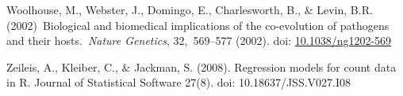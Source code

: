 \documentclass[12pt]{article}
\renewcommand{\_}{\kern-1.5pt\textunderscore\kern-1.5pt}
\begin{document}
\begin{FlushLeft}
Woolhouse, M., Webster, J., Domingo, E., Charlesworth, B., $\&$  Levin, B.R. (2002) Biological and biomedical implications of the co-evolution of pathogens and their hosts. \textit{Nature Genetics}, 32, 569–577 (2002). doi: \href{https://doi.org/10.1038/ng1202-569}{10.1038/ng1202-569}
\end{FlushLeft}\par

\begin{FlushLeft}
Zeileis, A., Kleiber, C., $\&$  Jackman, S. (2008). Regression models for count data in R. Journal of Statistical Software 27(8). doi: 10.18637/JSS.V027.I08 
\end{FlushLeft}\par


\printbibliography
\end{document}
